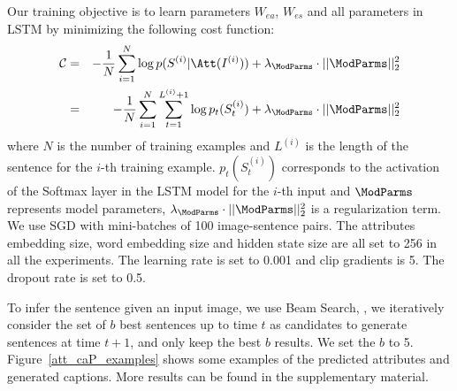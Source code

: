 Our training objective is to learn parameters $W_{ea}$, $W_{es}$ and all parameters in LSTM by minimizing the following cost function:
\begin{eqnarray}
    \mathcal{C}&=&-\frac{1}{N}\sum_{i=1}^N\log p(S^{(i)}|\Att(I^{(i)}))+\lambda_\ModParms\cdot||\ModParms||_2^2 \\
    &=&-\frac{1}{N}\sum_{i=1}^N\sum_{t=1}^{L^{(i)}+1}\log p_t(S_t^{(i)})+\lambda_\ModParms\cdot||\ModParms||_2^2
    \vspace{-3pt}
\end{eqnarray}
where $N$ is the number of training examples and $L^{(i)}$ is the length of the sentence for the $i$-th training example. $p_t(S_t^{(i)})$ corresponds to the activation of the Softmax layer in the LSTM model for the $i$-th input and $\ModParms$ represents model parameters, $\lambda_\ModParms\cdot||\ModParms||_2^2$ is a regularization term. We use SGD with mini-batches of 100 image-sentence pairs. The attributes embedding size, word embedding size and hidden state size are all set to 256 in all the experiments. The learning rate is set to 0.001 and clip gradients is 5. The dropout rate is set to 0.5.

To infer the sentence given an input image, we use Beam Search, \ie, we iteratively consider the set of $b$ best sentences up to time $t$ as candidates to generate sentences at time $t+1$, and only keep the best $b$ results. We set the $b$ to 5. Figure~\ref{att_caP_examples} shows some examples of the predicted attributes and generated captions. More results can be found in the supplementary material.
